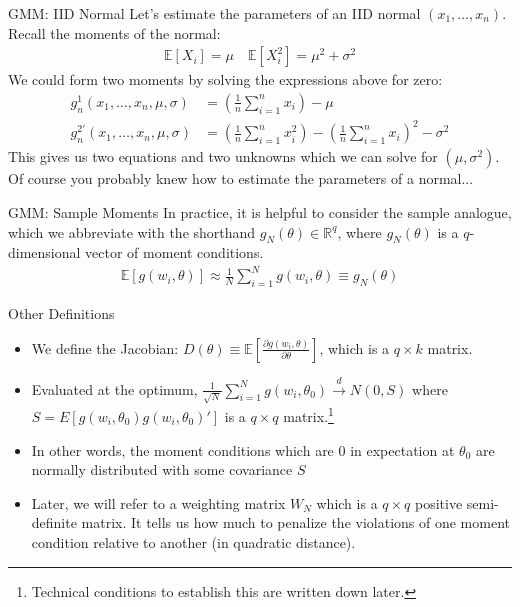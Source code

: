 \documentclass[aspectratio=169]{beamer}
\begin{document}
 \begin{frame}{GMM: IID Normal}
 Let's estimate the parameters of an IID normal $(x_1, \ldots, x_n)$. Recall the moments of the normal:
 \begin{align*}
 \mathbb{E}[X_i] = \mu \quad \mathbb{E}[X_i^2] = \mu^2 + \sigma^2
 \end{align*}
 We could form two moments by solving the expressions above for zero:
 \begin{align*}
 g_n^1(x_1,\ldots,x_n, \mu,\sigma)  &=  \left(\frac{1}{n} \sum_{i=1}^n x_i\right) - \mu\\
 g_n^{2'}(x_1,\ldots,x_n, \mu,\sigma)  &=  \left(\frac{1}{n} \sum_{i=1}^n x_i^2 \right) - \left(\frac{1}{n} \sum_{i=1}^n x_i\right)^2- \sigma^2
 \end{align*}
 This gives us two equations and two unknowns which we can solve for $(\mu,\sigma^2)$.\\
 Of course you probably knew how to estimate the parameters of a normal...
 \end{frame}
 
\begin{frame}{GMM: Sample Moments}
In practice, it is helpful to consider the sample analogue, which we abbreviate with the shorthand $g_N(\theta) \in \mathbb{R}^q$, where $g_N(\theta)$ is a $q$-dimensional vector of moment conditions.
\begin{eqnarray*}
\mathbb{E}[g(w_i, \theta )] \approx \frac{1}{N} \sum_{i=1}^N g(w_i, \theta)  \equiv g_N(\theta)
\end{eqnarray*}
\end{frame}

\begin{frame}{Other Definitions}
\begin{itemize}
\item We define the Jacobian: $D(\theta) \equiv \mathbb{E}[\frac{\partial g(w_i,\theta)}{\partial \theta}]$, which is a $q \times k$ matrix.
\item  Evaluated at the optimum, $\frac{1}{\sqrt{N}} \sum_{i=1}^N g(w_i,\theta_0) \overset{d}{\to} N(0,S)$ where $S = E[g(w_i,\theta_0) g(w_i,\theta_0)']$ is a $q \times q$ matrix.\footnote{Technical conditions to establish this are written down later.} 
\item In other words, the moment conditions which are $0$ in expectation at $\theta_0$ are normally distributed with some covariance $S$
\item Later, we will refer to a weighting matrix $W_N$ which is a $q \times q$ positive semi-definite matrix. It tells us how much to penalize the violations of one moment condition relative to another (in quadratic distance).
\end{itemize}
\end{frame}
\end{document}
